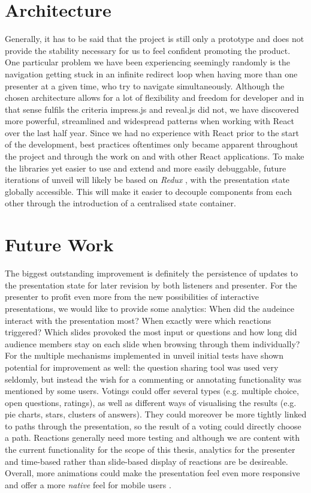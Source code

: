 \section{Architecture}
Generally, it has to be said that the project is still only a prototype and does not provide the stability necessary for us to feel confident promoting the product. One particular problem we have been experiencing seemingly randomly is the navigation getting stuck in an infinite redirect loop when having more than one presenter at a given time, who try to navigate simultaneously. 
Although the chosen architecture allows for a lot of flexibility and freedom for developer and in that sense fulfils the criteria impress.js and reveal.js did not, we have discovered more powerful, streamlined and widespread patterns when working with React over the last half year. Since we had no experience with React prior to the start of the development, best practices oftentimes only became apparent throughout the project and through the work on and with other React applications. To make the libraries yet easier to use and extend and more easily debuggable, future iterations of unveil will likely be based on \emph{Redux} \cite{redux}, with the presentation state globally accessible. This will make it easier to decouple components from each other through the introduction of a centralised state container.

\section{Future Work}
The biggest outstanding improvement is definitely the persistence of updates to the presentation state for later revision by both listeners and presenter. For the presenter to profit even more from the new possibilities of interactive presentations, we would like to provide some analytics: When did the audeince interact with the presentation most? When exactly were which reactions triggered? Which slides provoked the most input or questions and how long did audience members stay on each slide when browsing through them individually?
For the multiple mechanisms implemented in unveil initial tests have shown potential for improvement as well: the question sharing tool was used very seldomly, but instead the wish for a commenting or annotating functionality was mentioned by some users. Votings could offer several types (e.g. multiple choice, open questions, ratings), as well as different ways of visualising the results (e.g. pie charts, stars, clusters of answers). They could moreover be more tightly linked to paths through the presentation, so the result of a voting could directly choose a path.
Reactions generally need more testing and although we are content with the current functionality for the scope of this thesis, analytics for the presenter and time-based rather than slide-based display of reactions are be desireable.
Overall, more animations could make the presentation feel even more responsive and offer a more \emph{native} feel for mobile users \cite{GoogleMaterialDesignGuide}.

